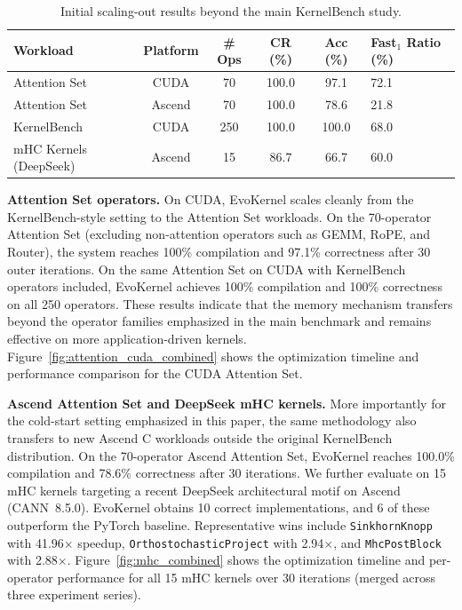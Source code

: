 \documentclass{article} %
\newcommand{\ourmethod}{EvoKernel\xspace}
\theoremstyle{definition}
\theoremstyle{remark}
\begin{document}
\begin{table}[!htbp]
\centering
\caption{Initial scaling-out results beyond the main KernelBench study.}
\label{tab:scaling_out}
\setlength{\tabcolsep}{8pt}
\renewcommand{\arraystretch}{1.15}
\begin{tabular}{lccccl}
\toprule
\textbf{Workload} & \textbf{Platform} & \textbf{\# Ops} & \textbf{CR (\%)} & \textbf{Acc (\%)} & \textbf{Fast$_1$ Ratio (\%)} \\
\midrule
Attention Set & CUDA & 70 & 100.0 & 97.1 & 72.1 \\
Attention Set & Ascend & 70 & 100.0 & 78.6 & 21.8 \\
KernelBench & CUDA & 250 & 100.0 & 100.0 & 68.0 \\
mHC Kernels (DeepSeek) & Ascend & 15 & 86.7 & 66.7 & 60.0 \\
\bottomrule
\end{tabular}
\end{table}

\textbf{Attention Set operators.}
On CUDA, EvoKernel scales cleanly from the KernelBench-style setting to the Attention Set workloads. On the 70-operator Attention Set (excluding non-attention operators such as GEMM, RoPE, and Router), the system reaches 100\% compilation and 97.1\% correctness after 30 outer iterations. On the same Attention Set on CUDA with KernelBench operators included, \ourmethod achieves 100\% compilation and 100\% correctness on all 250 operators. These results indicate that the memory mechanism transfers beyond the operator families emphasized in the main benchmark and remains effective on more application-driven kernels. Figure~\ref{fig:attention_cuda_combined} shows the optimization timeline and performance comparison for the CUDA Attention Set.

\textbf{Ascend Attention Set and DeepSeek mHC kernels.}
More importantly for the cold-start setting emphasized in this paper, the same methodology also transfers to new Ascend C workloads outside the original KernelBench distribution. On the 70-operator Ascend Attention Set, EvoKernel reaches 100.0\% compilation and 78.6\% correctness after 30 iterations. We further evaluate on 15 mHC kernels targeting a recent DeepSeek architectural motif on Ascend (CANN~8.5.0). EvoKernel obtains 10 correct implementations, and 6 of these outperform the PyTorch baseline. Representative wins include \texttt{SinkhornKnopp} with 41.96$\times$ speedup, \texttt{OrthostochasticProject} with 2.94$\times$, and \texttt{MhcPostBlock} with 2.88$\times$. Figure~\ref{fig:mhc_combined} shows the optimization timeline and per-operator performance for all 15 mHC kernels over 30 iterations (merged across three experiment series).
\end{document}
